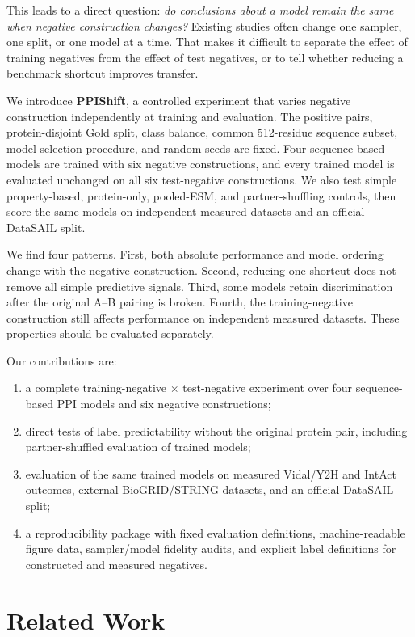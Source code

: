 \documentclass{article}
\begin{document}
This leads to a direct question: \emph{do conclusions about a model remain the
same when negative construction changes?} Existing studies often change one
sampler, one split, or one model at a time. That makes it difficult to separate
the effect of training negatives from the effect of test negatives, or to tell
whether reducing a benchmark shortcut improves transfer.

We introduce \textbf{PPIShift}, a controlled experiment that varies negative
construction independently at training and evaluation. The positive pairs,
protein-disjoint Gold split, class balance, common 512-residue sequence subset,
model-selection procedure, and random seeds are fixed. Four sequence-based
models are trained with six negative constructions, and every trained model is
evaluated unchanged on all six test-negative constructions. We also test simple
property-based, protein-only, pooled-ESM, and partner-shuffling controls, then
score the same models on independent measured datasets and an official
DataSAIL split.

We find four patterns. First, both absolute performance and model ordering
change with the negative construction. Second, reducing one shortcut does not
remove all simple predictive signals. Third, some models retain discrimination after the original A--B pairing is
broken. Fourth, the
training-negative construction still affects performance on independent
measured datasets. These properties should be evaluated separately.

Our contributions are:
\begin{enumerate}
  \item a complete training-negative $\times$ test-negative experiment over
  four sequence-based PPI models and six negative constructions;
  \item direct tests of label predictability without the original protein pair,
  including partner-shuffled evaluation of trained models;
  \item evaluation of the same trained models on measured Vidal/Y2H and IntAct
  outcomes, external BioGRID/STRING datasets, and an official DataSAIL split;
  \item a reproducibility package with fixed evaluation definitions,
  machine-readable figure data, sampler/model fidelity audits, and explicit
  label definitions for constructed and measured negatives.
\end{enumerate}

\section{Related Work}
\end{document}
